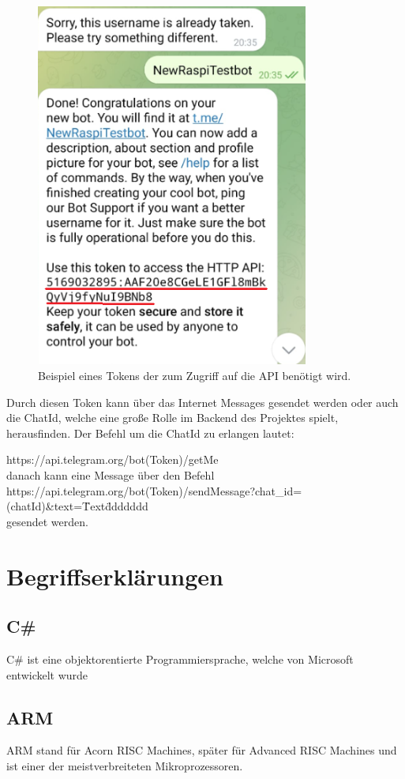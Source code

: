\begin{figure}[H]
    \centering
    \includegraphics[width=0.8\textwidth]{./pics/TelegramBotCreatedToken.png}
    \caption{Beispiel eines Tokens der zum Zugriff auf die API benötigt wird.}
\end{figure}

Durch diesen Token kann über das Internet Messages gesendet werden oder auch die ChatId, welche
eine große Rolle im Backend des Projektes spielt, herausfinden. Der Befehl um die ChatId zu erlangen lautet:

https://api.telegram.org/bot(Token)/getMe 
\\danach kann eine Message über den Befehl \\
https://api.telegram.org/bot(Token)/sendMessage?chat\_id=(chatId)\&text=\"Text\" ddddddd 
\\gesendet werden.

\section{Begriffserklärungen}

\subsection{C\#}
C\# ist eine objektorentierte Programmiersprache, welche von Microsoft entwickelt
wurde

\subsection{ARM}
ARM stand für Acorn RISC Machines, später für Advanced RISC Machines 
und ist einer der meistverbreiteten Mikroprozessoren.
